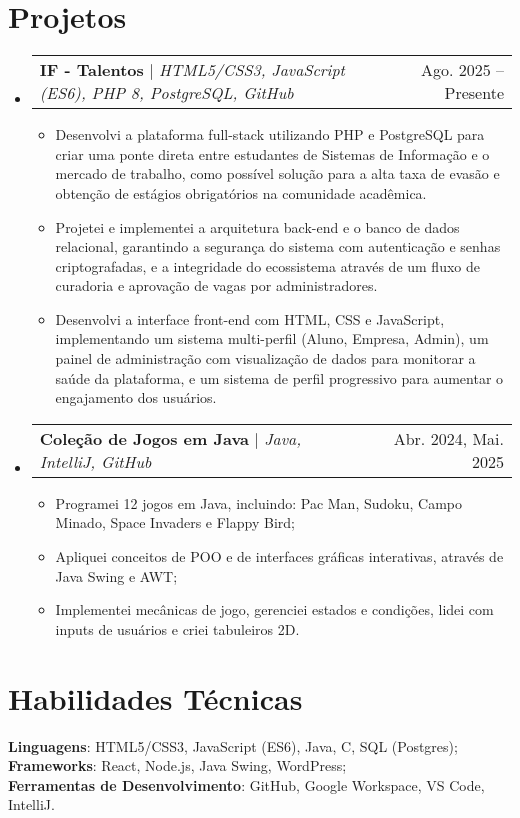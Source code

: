 \documentclass[letterpaper,11pt]{article}
\makeatletter
\newcommand{\resumeItem}[1]{
  \item\small{
    {#1 \vspace{-2pt}}
  }
}
\newcommand{\resumeProjectHeading}[2]{
    \item
    \begin{tabular*}{0.97\textwidth}{l@{\extracolsep{\fill}}r}
      \small#1 & #2 \\
    \end{tabular*}\vspace{-7pt}
}
\newcommand{\resumeSubHeadingListStart}{\begin{itemize}[leftmargin=0.15in, label={}]}
\newcommand{\resumeSubHeadingListEnd}{\end{itemize}}
\newcommand{\resumeItemListStart}{\begin{itemize}}
\newcommand{\resumeItemListEnd}{\end{itemize}\vspace{-5pt}}
\makeatother
\begin{document}
\section{Projetos}
    \resumeSubHeadingListStart
      \resumeProjectHeading
          {\textbf{IF - Talentos} $|$ \emph{HTML5/CSS3, JavaScript (ES6), PHP 8, PostgreSQL, GitHub}}{Ago. 2025 -- Presente}
          \resumeItemListStart
            \resumeItem{Desenvolvi a plataforma full-stack utilizando PHP e PostgreSQL para criar uma ponte direta entre estudantes de Sistemas de Informação e o mercado de trabalho, como possível solução para a alta taxa de evasão e obtenção de estágios obrigatórios na comunidade acadêmica.}
            \resumeItem{Projetei e implementei a arquitetura back-end e o banco de dados relacional, garantindo a segurança do sistema com autenticação e senhas criptografadas, e a integridade do ecossistema através de um fluxo de curadoria e aprovação de vagas por administradores.}
            \resumeItem{Desenvolvi a interface front-end com HTML, CSS e JavaScript, implementando um sistema multi-perfil (Aluno, Empresa, Admin), um painel de administração com visualização de dados para monitorar a saúde da plataforma, e um sistema de perfil progressivo para aumentar o engajamento dos usuários.}
          \resumeItemListEnd
      \resumeProjectHeading
          {\textbf{Coleção de Jogos em Java} $|$ \emph{Java, IntelliJ, GitHub}}{Abr. 2024, Mai. 2025}
          \resumeItemListStart
            \resumeItem{Programei 12 jogos em Java, incluindo: Pac Man, Sudoku, Campo Minado, Space Invaders e Flappy Bird;}
            \resumeItem{Apliquei conceitos de POO e de interfaces gráficas interativas, através de Java Swing e AWT;}
            \resumeItem{Implementei mecânicas de jogo, gerenciei estados e condições, lidei com inputs de usuários e criei tabuleiros 2D.}
          \resumeItemListEnd
    \resumeSubHeadingListEnd

\section{Habilidades Técnicas}
 \begin{itemize}[leftmargin=0.15in, label={}]
    \small{\item{
     \textbf{Linguagens}{: HTML5/CSS3, JavaScript (ES6), Java, C, SQL (Postgres);} \\
     \textbf{Frameworks}{: React, Node.js, Java Swing, WordPress;} \\
     \textbf{Ferramentas de Desenvolvimento}{: GitHub, Google Workspace, VS Code, IntelliJ.} \\
    }}
 \end{itemize}

\end{document}
